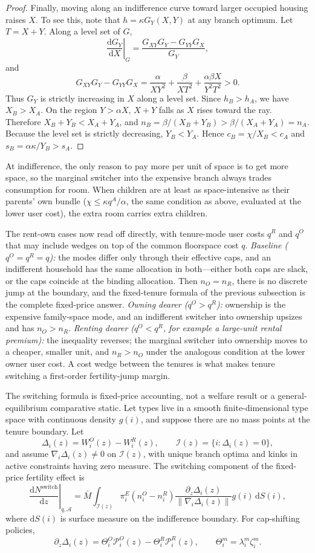 \documentclass[11pt]{article}
\newcommand{\dd}{\mathrm d}
\newcommand{\1}{\mathbf 1}
\begin{document}
\begin{proof}
Finally, moving along an indifference curve toward larger occupied housing raises $X$. To see this, note that $h=\kappa G_Y(X,Y)$ at any branch optimum. Let $T=X+Y$. Along a level set of $G$,
\[
\left.\frac{\dd G_Y}{\dd X}\right|_G
=
\frac{G_{XY}G_Y-G_{YY}G_X}{G_Y},
\]
and
\[
G_{XY}G_Y-G_{YY}G_X
=
\frac{\alpha}{XY^2}
+
\frac{\beta}{XT^2}
+
\frac{\alpha\beta X}{Y^2T^2}
>0.
\]
Thus $G_Y$ is strictly increasing in $X$ along a level set. Since $h_B>h_A$, we have $X_B>X_A$. On the region $Y>\alpha X$, $X+Y$ falls as $X$ rises toward the ray. Therefore $X_B+Y_B<X_A+Y_A$, and $n_B=\beta/(X_B+Y_B)>\beta/(X_A+Y_A)=n_A$. Because the level set is strictly decreasing, $Y_B<Y_A$. Hence $c_B=\chi/X_B<c_A$ and $s_B=\alpha\kappa/Y_B>s_A$.
\end{proof}

At indifference, the only reason to pay more per unit of space is to get more space, so the marginal switcher into the expensive branch always trades consumption for room. When children are at least as space-intensive as their parents' own bundle ($\chi\le\kappa q^A/\alpha$, the same condition as above, evaluated at the lower user cost), the extra room carries extra children.

The rent-own cases now read off directly, with tenure-mode user costs $q^R$ and $q^O$ that may include wedges on top of the common floorspace cost $q$. \emph{Baseline ($q^O=q^R=q$):} the modes differ only through their effective caps, and an indifferent household has the same allocation in both---either both caps are slack, or the caps coincide at the binding allocation. Then $n_O=n_R$, there is no discrete jump at the boundary, and the fixed-tenure formula of the previous subsection is the complete fixed-price answer. \emph{Owning dearer ($q^O>q^R$):} ownership is the expensive family-space mode, and an indifferent switcher into ownership upsizes and has $n_O>n_R$. \emph{Renting dearer ($q^O<q^R$, for example a large-unit rental premium):} the inequality reverses; the marginal switcher into ownership moves to a cheaper, smaller unit, and $n_R>n_O$ under the analogous condition at the lower owner user cost. A cost wedge between the tenures is what makes tenure switching a first-order fertility-jump margin.

The switching formula is fixed-price accounting, not a welfare result or a general-equilibrium comparative static. Let types live in a smooth finite-dimensional type space with continuous density $g(i)$, and suppose there are no mass points at the tenure boundary. Let
\[
\Delta_i(z)=W_i^O(z)-W_i^R(z),
\qquad
\mathcal I(z)=\{i:\Delta_i(z)=0\},
\]
and assume $\nabla_i\Delta_i(z)\ne0$ on $\mathcal I(z)$, with unique branch optima and kinks in active constraints having zero measure. The switching component of the fixed-price fertility effect is
\[
\left.\frac{\dd N^{\mathrm{switch}}}{\dd z}\right|_{q,\mathcal A}
=
\bar M
\int_{\mathcal I(z)}
\pi_i^E
\left(n_i^O-n_i^R\right)
\frac{\partial_z\Delta_i(z)}
{\|\nabla_i\Delta_i(z)\|}
g(i)\,\dd S(i),
\]
where $\dd S(i)$ is surface measure on the indifference boundary. For cap-shifting policies,
\[
\partial_z\Delta_i(z)
=
\Theta_i^O \mathcal P_i^O(z)-\Theta_i^R \mathcal P_i^R(z),
\qquad
\Theta_i^m=\lambda_i^m\zeta_i^m.
\]
\end{document}
